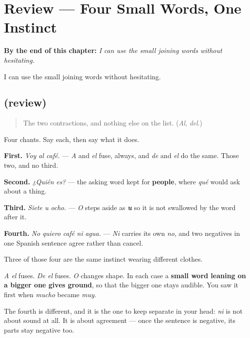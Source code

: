 
\chapter{Review --- Four Small Words, One Instinct}
\label{ch:repaso-juntores}

\begin{chapteropening}
\textbf{By the end of this chapter:} \emph{I can use the small joining words without hesitating.}

I can use the small joining words without hesitating.
\end{chapteropening}

\section[(review)]{(review)}

\label{lesson:ES-C61-repaso-juntores}



\begin{quote}
The two contractions, and nothing else on the list. (\emph{Al}, \emph{del}.)
\end{quote}

\begin{grammarlens}[title={What you've built}]
Four chants. Say each, then say what it does.

\textbf{First.} \emph{Voy al café.} — \emph{A} and \emph{el} fuse, always, and \emph{de} and \emph{el} do the same. Those two, and no third.

\textbf{Second.} \emph{¿Quién es?} — the asking word kept for \textbf{people}, where \emph{qué} would ask about a thing.

\textbf{Third.} \emph{Siete u ocho.} — \emph{O} steps aside as \emph{\textbf{u}} so it is not swallowed by the word after it.

\textbf{Fourth.} \emph{No quiero café ni agua.} — \emph{Ni} carries its own \emph{no}, and two negatives in one Spanish sentence agree rather than cancel.
\end{grammarlens}

\begin{grammarlens}[title={Grammar Lens: one instinct underneath}]
Three of those four are the same instinct wearing different clothes.

\emph{A el} fuses. \emph{De el} fuses. \emph{O} changes shape. In each case a \textbf{small word leaning on a bigger one gives ground}, so that the bigger one stays audible. You saw it first when \emph{mucho} became \emph{muy}.

The fourth is different, and it is the one to keep separate in your head: \emph{ni} is not about sound at all. It is about agreement — once the sentence is negative, its parts stay negative too.
\end{grammarlens}

